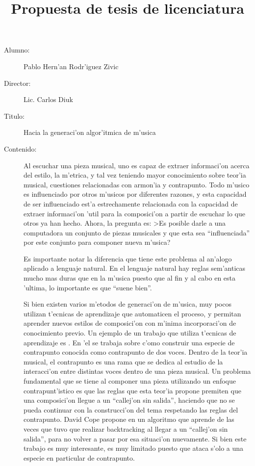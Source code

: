 \documentclass[a4paper,10pt]{article}
\title{Propuesta de tesis de licenciatura}
\begin{document}
\maketitle
 \begin{description}
  \item[Alumno:] Pablo Hern'an Rodr'iguez Zivic
  \item[Director:] Lic. Carlos Diuk
  \item[Titulo:] Hacia la generaci'on algor'itmica de m'usica
  \item[Contenido:] Al escuchar una pieza musical, uno es capaz de extraer informaci'on acerca del 
	estilo, la m'etrica, y tal vez teniendo mayor conocimiento sobre teor'ia musical, cuestiones relacionadas 
	con armon'ia y contrapunto. Todo m'usico es influenciado por otros m'usicos por diferentes razones, 
	y esta capacidad de ser influenciado est'a estrechamente relacionada con la capacidad de extraer 
	informaci'on 'util para la composici'on a partir de escuchar lo que otros ya han hecho.
	Ahora, la pregunta es: >Es posible darle a una computadora un conjunto de piezas musicales y que esta sea 
	``influenciada'' por este conjunto para componer nueva m'usica?
    
    Es importante notar la diferencia que 
	tiene este problema al an'alogo aplicado a lenguaje natural. En el lenguaje natural hay reglas sem'anticas
	mucho mas duras que en la m'usica puesto que al fin y al cabo en esta 'ultima, lo importante es que 
	``suene bien''.
	

	Si bien existen varios m'etodos de generaci'on de m'usica, muy pocos utilizan t'ecnicas de aprendizaje 
	que automaticen el proceso, y permitan aprender nuevos estilos de composici'on con m'inima
	incorporaci'on de conocimiento previo. Un ejemplo de un trabajo que utiliza t'ecnicas de aprendizaje es 
	\cite{DaCo}. En 'el se trabaja sobre c'omo construir una especie de contrapunto conocida como contrapunto 
	de dos voces. Dentro de la teor'ia musical, el contrapunto es una rama que se dedica al estudio de la 
	interacci'on entre distintas voces dentro de una pieza musical. Un problema fundamental que se tiene 
	al componer una pieza utilizando un enfoque contrapunt'istico es que las reglas que esta teor'ia propone 
	premiten que una composici'on llegue a un ``callej'on sin salida'', haciendo que no se pueda continuar 
	con la construcci'on del tema respetando las reglas del contrapunto. David Cope propone en \cite{DaCo} 
	un algoritmo que aprende de las veces que tuvo que realizar backtracking al llegar a un ``callej'on sin 
	salida'', para no volver a pasar por esa situaci'on nuevamente. Si bien este trabajo es muy
	interesante, es muy limitado puesto que ataca s'olo a una especie en particular de contrapunto.
	 

\end{description}
\end{document}
